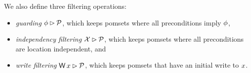 We also define three filtering operations:
\begin{itemize}
\item \emph{guarding} $\phi\mathbin\rhd\mathcal{P}$, which
  keeps pomsets where all preconditions imply $\phi$, 
\item \emph{independency filtering} $\mathcal{X}\mathbin\rhd\mathcal{P}$, which keeps pomsets
  where all preconditions are location independent, and
\item \emph{write filtering} $\DW{\aLoc}{}\guard\aPSS$, which keeps pomsets
  that have an initial write to $x$.
\end{itemize}






